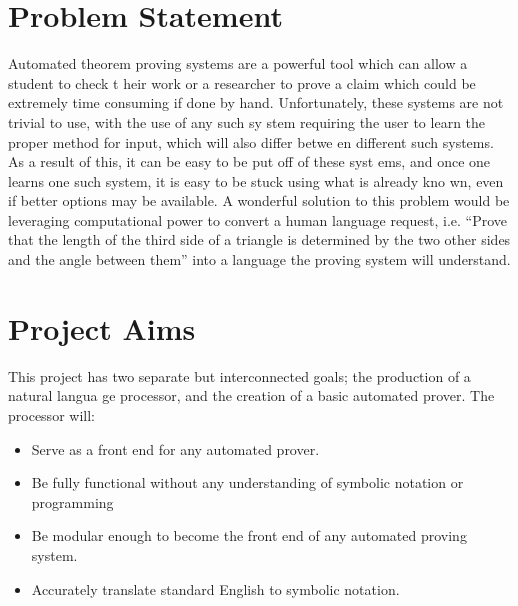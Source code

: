 \section{Problem Statement}                                                            
Automated theorem proving systems are a powerful tool which can allow a student to check t
heir work or a researcher to prove a claim which could be extremely time consuming if done
 by hand. Unfortunately, these systems are not trivial to use, with the use of any such sy
stem requiring the user to learn the proper method for input, which will also differ betwe
en different such systems. As a result of this, it can be easy to be put off of these syst
ems, and once one learns one such system, it is easy to be stuck using what is already kno
wn, even if better options may be available. A wonderful solution to this problem would be
 leveraging computational power to convert a human language request, i.e. ``Prove that the
 length of the third side of a triangle is determined by the two other sides and the angle
 between them'' into a language the proving system will understand.

 \section{Project Aims}                                                                 
This project has two separate but interconnected goals; the production of a natural langua
ge processor, and the creation of a basic automated prover. The processor will:           
\begin{itemize}                                                                           
\item{Serve as a front end for any automated prover.}                                     
\item{Be fully functional without any understanding of symbolic notation or programming}  
\item{Be modular enough to become the front end of any automated proving system.}         
\item{Accurately translate standard English to symbolic notation.}                        
\end{itemize}                                                                             
                                                                                          
